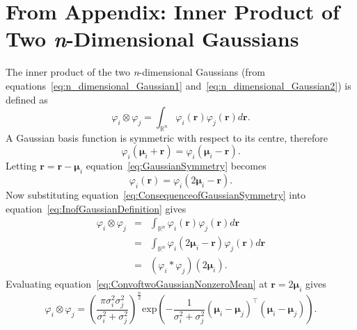 \documentclass[10pt]{article}
\begin{document}
\section*{From Appendix: Inner Product of Two \emph{n}-Dimensional Gaussians}\label{ap:InnerProdOfGaussians}
The inner product of the two \emph{n}-dimensional Gaussians (from equations~\ref{eq:n_dimensional_Gaussian1} and~\ref{eq:n_dimensional_Gaussian2}) is defined as
\begin{equation}\label{eq:InofGaussianDefinition}
\varphi_i\otimes\varphi_j=\int_{\mathbb{R}^n}\varphi_i(\mathbf r)\varphi_j(\mathbf r)d\mathbf{r}.
\end{equation}
A Gaussian basis function is symmetric with respect to its centre, therefore
\begin{equation}\label{eq:GaussianSymmetry}
 \varphi_i(\boldsymbol \mu_i+\mathbf r)= \varphi_i(\boldsymbol \mu_i-\mathbf r).
\end{equation}
Letting $\mathbf{r}= \mathbf{r}-\boldsymbol{\mu}_i$ equation~\ref{eq:GaussianSymmetry} becomes
\begin{equation}\label{eq:ConsequenceofGaussianSymmetry}
 \varphi_i(\mathbf r)= \varphi_i(2\boldsymbol \mu_i-\mathbf r).
\end{equation}
Now substituting equation~\ref{eq:ConsequenceofGaussianSymmetry} into equation~\ref{eq:InofGaussianDefinition} gives 
\begin{eqnarray}
\varphi_i\otimes\varphi_j&=&\int_{\mathbb{R}^n}\varphi_i(\mathbf r)\varphi_j(\mathbf r)d\mathbf r\\
&=&\int_{\mathbb{R}^n}\varphi_i(2\boldsymbol \mu_i-\mathbf r)\varphi_j(\mathbf r)d\mathbf r\\
&=&(\varphi_i*\varphi_j)(2\boldsymbol \mu_i).
\end{eqnarray}
Evaluating equation~\ref{eq:ConvoftwoGaussianNonzeroMean} at $\mathbf r=2\boldsymbol\mu_i $ gives
\begin{equation}
 \varphi_i\otimes\varphi_j=\left(\frac{\pi\sigma_i^2\sigma_j^2}{\sigma_i^2+\sigma_j^2}\right)^{\frac{n}{2}}\mathrm{exp}\left({-\frac{1}{\sigma_i^2+\sigma_j^2} (\boldsymbol\mu_i-\boldsymbol\mu_j)^\top(\boldsymbol\mu_i-\boldsymbol\mu_j)}\right).
\end{equation}

\end{document}
